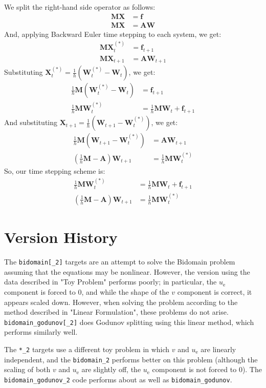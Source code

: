 \documentclass{article}
\newcommand{\bvec}[1]{\boldsymbol{#1}}
\newcommand{\bmat}[1]{\boldsymbol{#1}}
\begin{document}
We split the right-hand side operator as follows:
\begin{align*}
    \bmat{M} \bvec{X} & = \bvec{f} \\
    \bmat{M} \bvec{X} & = \bmat{A} \bvec{W}
\end{align*}
And, applying Backward Euler time stepping to each system, we get:
\begin{align*}
    \bmat{M} \bvec{X}_t^{(*)} & = \bvec{f}_{t + 1} \\
    \bmat{M} \bvec{X}_{t + 1} & = \bvec{A} \bvec{W}_{t + 1}
\end{align*}
\noindent Substituting $\bvec{X}_t^{(*)} = \frac{1}{h} (\bvec{W}_t^{(*)} - \bvec{W}_t)$,
we get:
\begin{align*}
    \frac{1}{h} \bmat{M} (\bvec{W}_t^{(*)} - \bvec{W}_t) & = \bvec{f}_{t + 1} \\
    \frac{1}{h} \bmat{M} \bvec{W}_t^{(*)} & = \frac{1}{h} \bmat{M} \bvec{W}_t + \bvec{f}_{t + 1}
\end{align*}
\noindent And substituting $\bvec{X}_{t + 1} = \frac{1}{h} (\bvec{W}_{t + 1} - \bvec{W}_t^{(*)})$,
we get:
\begin{align*}
    \frac{1}{h} \bmat{M} (\bvec{W}_{t + 1} - \bvec{W}_t^{(*)}) & = \bmat{A} \bvec{W}_{t + 1} \\
    (\frac{1}{h} \bmat{M} - \bmat{A}) \bvec{W}_{t + 1} & = \frac{1}{h} \bmat{M} \bvec{W}_t^{(*)}
\end{align*}
\noindent So, our time stepping scheme is:
\begin{align*}
    \frac{1}{h} \bmat{M} \bvec{W}_t^{(*)} & = \frac{1}{h} \bmat{M} \bvec{W}_t + \bvec{f}_{t + 1} \\
    (\frac{1}{h} \bmat{M} - \bmat{A}) \bvec{W}_{t + 1} & = \frac{1}{h} \bmat{M} \bvec{W}_t^{(*)}
\end{align*}

\newpage

\section{Version History}

The \texttt{bidomain[\_2]} targets are an attempt to solve the Bidomain problem
assuming that the equations may be nonlinear. However, the version using
the data described in "Toy Problem" performs poorly;
in particular, the $u_\text{e}$ component is forced to $0$,
and while the shape of the $v$ component is correct,
it appears scaled down.
However, when solving the problem according to the method described
in "Linear Formulation", these problems do not arise.
\texttt{bidomain\_godunov[\_2]} does Godunov splitting using this
linear method, which performs similarly well.

The \texttt{*\_2} targets use a different toy problem in which
$v$ and $u_\text{e}$ are linearly independent,
and the \texttt{bidomain\_2} performs better on this problem
(although the scaling of both $v$ and $u_\text{e}$ are slightly off,
the $u_\text{e}$ component is not forced to $0$).
The \texttt{bidomain\_godunov\_2} code performs
about as well as \texttt{bidomain\_godunov}.
\end{document}
